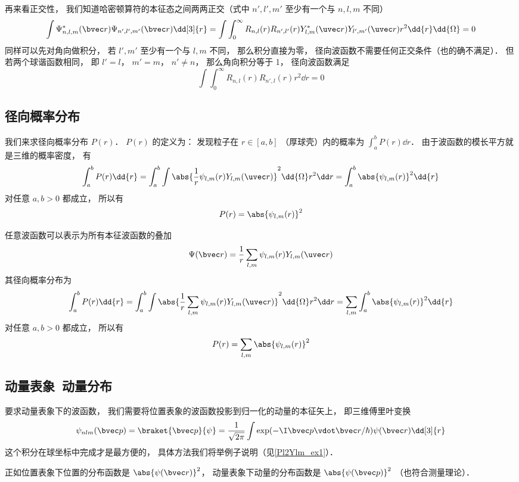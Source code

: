 再来看正交性， 我们知道哈密顿算符的本征态之间两两正交（式中 $n',l',m'$ 至少有一个与 $n, l, m$ 不同）
\begin{equation}
\int \Psi_{n,l,m}^*(\bvec r) \Psi_{n',l',m'}(\bvec r) \dd[3]{r}
= \int \int_0^\infty R_{n,l}(r) R_{n',l'}(r) Y_{l,m}^*(\uvec r)  Y_{l',m'}(\uvec r) r^2 \dd{r}\dd{\Omega} = 0
\end{equation}
同样可以先对角向做积分， 若 $l',m'$ 至少有一个与 $l, m$ 不同， 那么积分直接为零， 径向波函数不需要任何正交条件（也的确不满足）． 但若两个球谐函数相同， 即 $l' = l$， $m' = m$， $n' \ne n$， 那么角向积分等于 1， 径向波函数满足
\begin{equation}
\int \int_0^\infty R_{n,l}(r) R_{n',l}(r) r^2 \dd{r} = 0
\end{equation}

\subsection{径向概率分布}
我们来求径向概率分布 $P(r)$． $P(r)$ 的定义为： 发现粒子在 $r \in [a, b]$ （厚球壳）内的概率为 $\int_a^b P(r) \dd{r}$． 由于波函数的模长平方就是三维的概率密度， 有
\begin{equation}
\int_a^b P(r) \dd{r} = \int_a^b \int \abs{\frac1r \psi_{l,m}(r) Y_{l,m}(\uvec r)}^2 \dd{\Omega} r^2 \dd r
= \int_a^b \abs{\psi_{l,m}(r)}^2 \dd{r}
\end{equation}
对任意 $a, b > 0$ 都成立， 所以有
\begin{equation}
P(r) = \abs{\psi_{l,m}(r)}^2
\end{equation}

任意波函数可以表示为所有本征波函数的叠加
\begin{equation}
\Psi(\bvec r) = \frac1r \sum_{l,m} \psi_{l,m}(r) Y_{l,m}(\uvec r)
\end{equation}
其径向概率分布为
\begin{equation}\label{HWF_eq4}
\int_a^b P(r) \dd{r} = \int_a^b \int \abs{\frac1r \sum_{l,m}\psi_{l,m}(r) Y_{l,m}(\uvec r)}^2 \dd{\Omega} r^2 \dd r
= \sum_{l,m} \int_a^b \abs{\psi_{l,m}(r)}^2 \dd{r}
\end{equation}
对任意 $a, b > 0$ 都成立， 所以有
\begin{equation}
P(r) = \sum_{l,m} \abs{\psi_{l,m}(r)}^2
\end{equation}

\subsection{动量表象\ 动量分布}
要求动量表象下的波函数， 我们需要将位置表象的波函数投影到归一化的动量的本征矢上， 即三维傅里叶变换
\begin{equation}
\psi_{nlm}(\bvec p) = \braket{\bvec p}{\psi} = \frac{1}{\sqrt{2\pi}} \int \exp(-\I \bvec p \vdot \bvec r/\hbar) \psi(\bvec r) \dd[3]{r}
\end{equation}
这个积分在球坐标中完成才是最方便的， 具体方法我们将举例子说明（见\autoref{Pl2Ylm_ex1}）．

正如位置表象下位置的分布函数是 $\abs{\psi(\bvec r)}^2$， 动量表象下动量的分布函数是 $\abs{\psi(\bvec p)}^2$ （也符合测量理论）．

